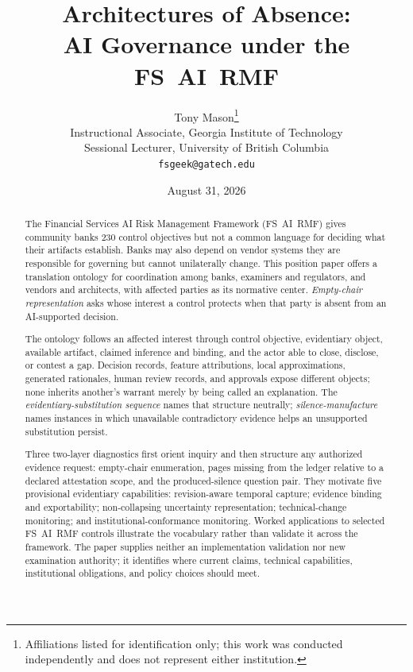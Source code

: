 \documentclass[11pt]{article}
\title{Architectures of Absence:\\AI Governance under the FS~AI~RMF}
\author{Tony Mason\thanks{Affiliations listed for identification only; this work was conducted independently and does not represent either institution.}\\
  Instructional Associate, Georgia Institute of Technology\\
  Sessional Lecturer, University of British Columbia\\
  \texttt{fsgeek@gatech.edu}}
\date{August 31, 2026}
\begin{document}
\maketitle

\begin{abstract}
The Financial Services AI Risk Management Framework (FS~AI~RMF) gives community
banks 230 control objectives but not a common language for deciding what their
artifacts establish. Banks may also depend on vendor systems they are responsible
for governing but cannot unilaterally change. This position paper offers a
translation ontology for coordination among banks, examiners and regulators,
and vendors and architects, with affected parties as its normative center.
\emph{Empty-chair representation} asks whose interest a control protects when
that party is absent from an AI-supported decision.

The ontology follows an affected interest through control objective,
evidentiary object, available artifact, claimed inference and binding, and the
actor able to close, disclose, or contest a gap. Decision records, feature
attributions, local approximations, generated rationales, human review records,
and approvals expose different objects; none inherits another's warrant merely
by being called an explanation. The \emph{evidentiary-substitution sequence}
names that structure neutrally; \emph{silence-manufacture} names instances in
which unavailable contradictory evidence helps an unsupported substitution
persist.

Three two-layer diagnostics first orient inquiry and then structure any
authorized evidence request: empty-chair enumeration, pages missing from the
ledger relative to a declared attestation scope, and the produced-silence
question pair. They motivate five provisional evidentiary capabilities:
revision-aware temporal capture; evidence binding and exportability;
non-collapsing uncertainty representation; technical-change monitoring; and
institutional-conformance monitoring. Worked applications to selected
FS~AI~RMF controls illustrate the vocabulary rather than validate it across the
framework. The paper supplies neither an implementation validation nor new
examination authority; it identifies where current claims, technical
capabilities, institutional obligations, and policy choices should meet.
\end{abstract}










\printbibliography
\end{document}
